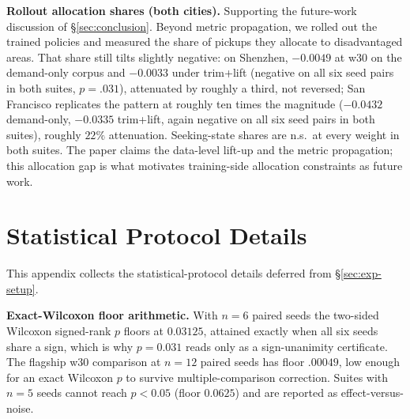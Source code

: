 \textbf{Rollout allocation shares (both cities).} Supporting the future-work
discussion of \S\ref{sec:conclusion}. Beyond metric propagation, we rolled
out the trained policies and measured the share of pickups they allocate to
disadvantaged areas. That share still tilts slightly negative: on Shenzhen,
$-0.0049$ at w30 on the demand-only corpus and $-0.0033$ under trim+lift
(negative on all six seed pairs in both suites, $p = .031$), attenuated by
roughly a third, not reversed; San Francisco replicates the pattern at
roughly ten times the magnitude ($-0.0432$ demand-only, $-0.0335$
trim+lift, again negative on all six seed pairs in both suites), roughly
$22\%$ attenuation. Seeking-state shares are n.s.\ at every weight in both
suites. The paper claims the data-level lift-up and the metric propagation;
this allocation gap is what motivates training-side allocation constraints
as future work.

\section{Statistical Protocol Details}\label{app:protocol}

This appendix collects the statistical-protocol details deferred from
\S\ref{sec:exp-setup}.

\textbf{Exact-Wilcoxon floor arithmetic.} With $n = 6$ paired seeds the
two-sided Wilcoxon signed-rank $p$ floors at $0.03125$, attained exactly
when all six seeds share a sign, which is why $p = 0.031$ reads only as a
sign-unanimity certificate. The flagship w30 comparison at $n = 12$ paired
seeds has floor $.00049$, low enough for an exact Wilcoxon $p$ to survive
multiple-comparison correction. Suites with $n = 5$ seeds cannot reach
$p < 0.05$ (floor $0.0625$) and are reported as effect-versus-noise.

